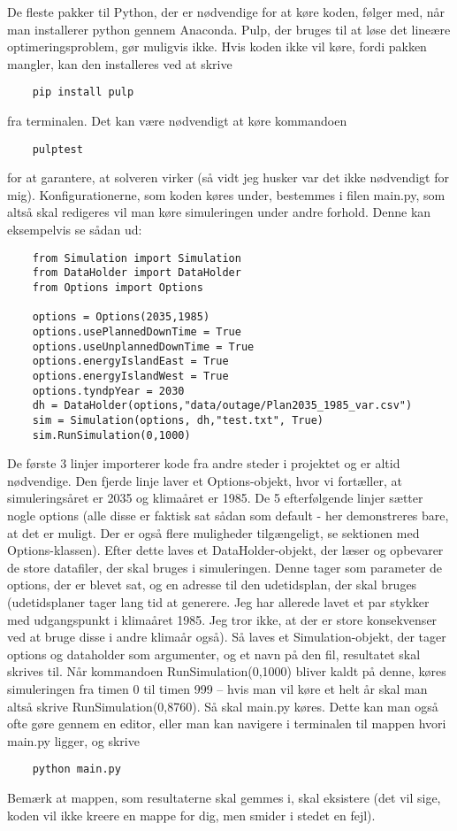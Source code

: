 \documentclass{article}
\begin{document}
De fleste pakker til Python, der er nødvendige for at køre koden, følger med, når man installerer python gennem Anaconda. Pulp, der bruges til at løse det lineære optimeringsproblem, gør muligvis ikke. Hvis koden ikke vil køre, fordi pakken mangler, kan den installeres ved at skrive 
\begin{verbatim}
    pip install pulp
\end{verbatim}
fra terminalen. Det kan være nødvendigt at køre kommandoen 
\begin{verbatim}
    pulptest
\end{verbatim}
for at garantere, at solveren virker (så vidt jeg husker var det ikke nødvendigt for mig). Konfigurationerne, som koden køres under, bestemmes i filen main.py, som altså skal redigeres vil man køre simuleringen under andre forhold. Denne kan eksempelvis se sådan ud:
\begin{verbatim}
    from Simulation import Simulation
    from DataHolder import DataHolder
    from Options import Options
    
    options = Options(2035,1985)
    options.usePlannedDownTime = True
    options.useUnplannedDownTime = True
    options.energyIslandEast = True
    options.energyIslandWest = True
    options.tyndpYear = 2030
    dh = DataHolder(options,"data/outage/Plan2035_1985_var.csv")
    sim = Simulation(options, dh,"test.txt", True)
    sim.RunSimulation(0,1000)
\end{verbatim}
De første 3 linjer importerer kode fra andre steder i projektet og er altid nødvendige. Den fjerde linje laver et Options-objekt, hvor vi fortæller, at simuleringsåret er 2035 og klimaåret er 1985. De 5 efterfølgende linjer sætter nogle options (alle disse er faktisk sat sådan som default - her demonstreres bare, at det er muligt. Der er også flere muligheder tilgængeligt, se sektionen med Options-klassen). Efter dette laves et DataHolder-objekt, der læser og opbevarer de store datafiler, der skal bruges i simuleringen. Denne tager som parameter de options, der er blevet sat, og en adresse til den udetidsplan, der skal bruges (udetidsplaner tager lang tid at generere. Jeg har allerede lavet et par stykker med udgangspunkt i klimaåret 1985. Jeg tror ikke, at der er store konsekvenser ved at bruge disse i andre klimaår også). Så laves et Simulation-objekt, der tager options og dataholder som argumenter, og et navn på den fil, resultatet skal skrives til. Når kommandoen RunSimulation(0,1000) bliver kaldt på denne, køres simuleringen fra timen 0 til timen 999 -- hvis man vil køre et helt år skal man altså skrive RunSimulation(0,8760). Så skal main.py køres. Dette kan man også ofte gøre gennem en editor, eller man kan navigere i terminalen til mappen hvori main.py ligger, og skrive 
\begin{verbatim}
    python main.py
\end{verbatim}
Bemærk at mappen, som resultaterne skal gemmes i, skal eksistere (det vil sige, koden vil ikke kreere en mappe for dig, men smider i stedet en fejl). 
\end{document}
